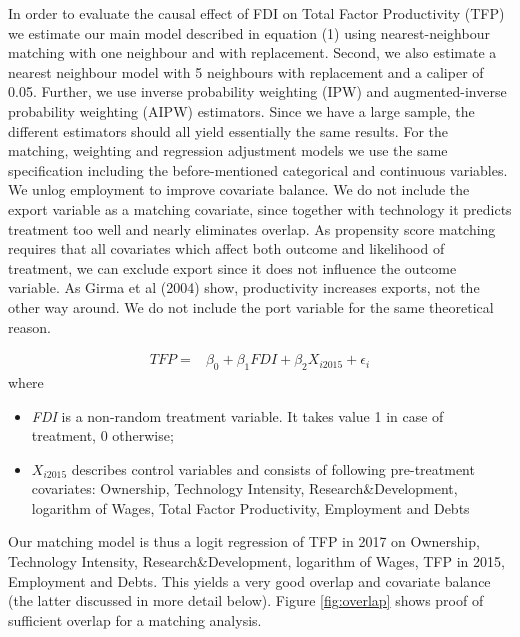 \documentclass[a4paper,11pt]{scrartcl}
\begin{document}
In order to evaluate the causal effect of FDI on Total Factor Productivity (TFP) we estimate our main model described in equation (1) using nearest-neighbour matching with one neighbour and with replacement. Second, we also estimate a nearest neighbour model with 5 neighbours with replacement and a caliper of 0.05. Further, we use  inverse probability weighting (IPW) and augmented-inverse probability weighting (AIPW) estimators. Since we have a large sample, the different estimators should all yield essentially the same results.
For the matching,  weighting  and regression adjustment models we use the same specification including the before-mentioned categorical and continuous variables. We unlog employment to improve covariate balance. We do not include the export variable as a matching covariate, since together with technology it predicts treatment too well and nearly eliminates overlap. 
As propensity score matching requires that all covariates which affect both outcome and likelihood of treatment, we can exclude export since it does not influence the outcome variable. As Girma et al (2004) show, productivity increases exports, not the other way around. We do not include the port variable for the same theoretical reason.
 

\begin{align*}
TFP  =&  \beta_{0} + \beta_{1} FDI + \beta_{2} X_{i 2015} + \epsilon_{i}   
\end{align*}
where
\begin{itemize}
\item \textit{FDI} is a non-random treatment variable. It takes value 1 in case of treatment, 0 otherwise;
\item  $X_{i 2015}$ describes control variables and consists of following pre-treatment covariates: Ownership, Technology Intensity, Research\&Development, logarithm of Wages, Total Factor Productivity, Employment and Debts
\end{itemize}

Our matching model is thus a logit regression of TFP in 2017 on Ownership, Technology Intensity, Research\&Development, logarithm of Wages, TFP in 2015, Employment and Debts. This yields a very good overlap and covariate balance (the latter discussed in more detail below). Figure \ref{fig:overlap} shows proof of sufficient overlap for a matching analysis. 
\end{document}

